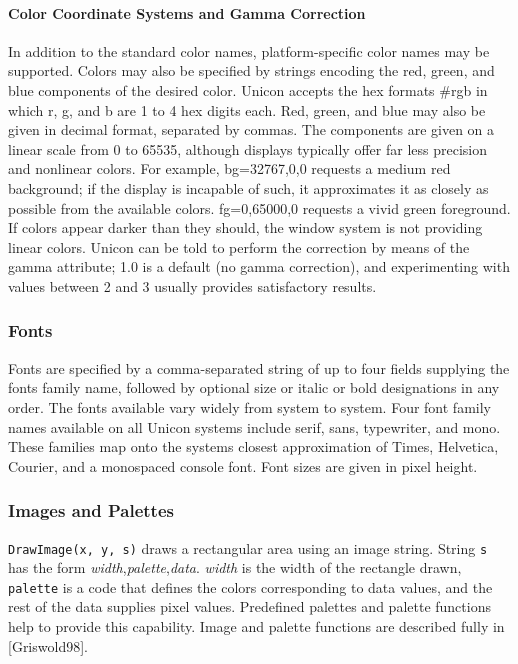 \paragraph{Color Coordinate Systems and Gamma Correction}
In addition to the standard color names, platform-specific color names
may be supported. Colors may also be specified by strings encoding the
red, green, and blue components of the desired color. Unicon accepts
the hex formats {\textquotedbl}\#rgb{\textquotedbl} in which r, g, and
b are 1 to 4 hex digits each. Red, green, and blue may also be given
in decimal format, separated by commas. The components are given on a
linear scale from 0 to 65535, although displays typically offer far
less precision and nonlinear colors. For example,
{\textquotedbl}bg=32767,0,0{\textquotedbl} requests a medium red
background; if the display is incapable of such, it approximates it as
closely as possible from the available colors.
{\textquotedbl}fg=0,65000,0{\textquotedbl} requests a vivid green
foreground. If colors appear darker than they should, the window system
is not providing linear colors. Unicon can be told to perform the
correction by means of the gamma attribute; 1.0 is a default (no gamma
correction), and experimenting with values between 2 and 3 usually
provides satisfactory results.

\subsubsection{Fonts}

Fonts are specified by a comma-separated string of up to four fields
supplying the font{\textquotesingle}s family name, followed by optional
size or italic or bold designations in any order. The fonts available
vary widely from system to system. Four font family names available on
all Unicon systems include serif, sans, typewriter, and mono. These
families map onto the system{\textquotesingle}s closest approximation
of Times, Helvetica, Courier, and a monospaced console font. Font sizes
are given in pixel height.

\subsubsection{Images and Palettes}

\texttt{DrawImage(x, y, s)} draws a rectangular area using an image string.
String \texttt{s} has the form
{\textquotedbl}\textit{width},\textit{palette},\textit{data}{\textquotedbl}.
\textit{width} is the width of the rectangle drawn, \texttt{palette} is a code
that defines the colors corresponding to data values, and the rest of
the data supplies pixel values. Predefined palettes and palette
functions help to provide this capability. Image and palette
functions are described fully in [Griswold98].

